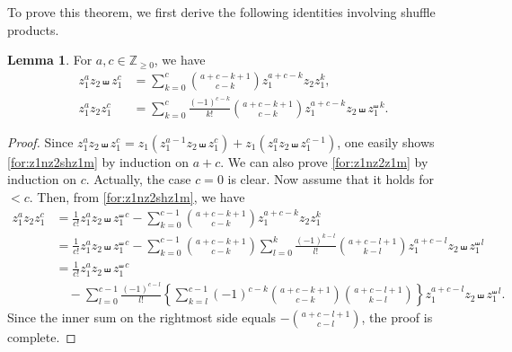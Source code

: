 \documentclass[12pt]{amsart}%
\theoremstyle{definition}
\newtheorem{lemma}[theorem]{Lemma}
\begin{document}
To prove this theorem,
we first derive the following identities involving shuffle products.

\begin{lemma}
For $a,c\in\mathbb{Z}_{\ge 0}$, we have 
\begin{align}
\label{for:z1nz2shz1m}
 z^a_1z_2\shuffle z^c_1
&=\sum^{c}_{k=0}\binom{a+c-k+1}{c-k}z^{a+c-k}_1z_2z^{k}_1,\\
\label{for:z1nz2z1m}
 z^a_1z_2z^c_1
&=\sum^{c}_{k=0}\frac{(-1)^{c-k}}{k!}\binom{a+c-k+1}{c-k}z^{a+c-k}_1z_2\shuffle z^{\shuffle \,k}_1.
\end{align}
\end{lemma}
\begin{proof}
Since 
$z^a_1z_2\shuffle z^c_1
=z_1(z^{a-1}_1z_2\shuffle z^c_1)+z_1(z^a_1z_2\shuffle z^{c-1}_1)$,
one easily shows \eqref{for:z1nz2shz1m} by induction on $a+c$.
We can also prove \eqref{for:z1nz2z1m} by induction on $c$.
Actually, the case $c=0$ is clear. 
Now assume that it holds for $<c$. 
Then, from \eqref{for:z1nz2shz1m}, we have  
\begin{align*}
z^{a}_1z_2z^{c}_1
&=\frac{1}{c!}z^a_1z_2\shuffle z^{\shuffle \,c}_1
-\sum^{c-1}_{k=0}\binom{a+c-k+1}{c-k}z^{a+c-k}_1z_2z^{k}_1\\
&=\frac{1}{c!}z^a_1z_2\shuffle z^{\shuffle \,c}_1-\sum^{c-1}_{k=0}\binom{a+c-k+1}{c-k}\sum^{k}_{l=0}\frac{(-1)^{k-l}}{l!}\binom{a+c-l+1}{k-l}z^{a+c-l}_1z_2\shuffle z^{\shuffle \,l}_1\\
&=\frac{1}{c!}z^a_1z_2\shuffle z^{\shuffle \,c}_1\\
&\quad 
-\sum^{c-1}_{l=0}\frac{(-1)^{c-l}}{l!}
\left\{
\sum^{c-1}_{k=l}(-1)^{c-k}
\binom{a+c-k+1}{c-k}\binom{a+c-l+1}{k-l}\right\}
z^{a+c-l}_1z_2\shuffle z^{\shuffle \,l}_1.
\end{align*}
Since the inner sum on the rightmost side equals $-\binom{a+c-l+1}{c-l}$,
the proof is complete.
\end{proof}
\end{document}
